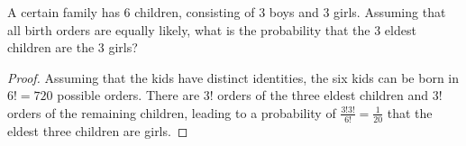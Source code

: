\begin{exercise}{24}
A certain family has 6 children, consisting of 3 boys and 3 girls. Assuming that all
birth orders are equally likely, what is the probability that the 3 eldest children are the
3 girls?
\end{exercise}

\begin{proof}
    Assuming that the kids have distinct identities, the six kids can be born in $6! = 720$ possible orders. There are $3!$ orders of the three eldest children and $3!$ orders of the remaining children, leading to a probability of $\frac{3!3!}{6!} = \frac{1}{20}$ that the eldest three children are girls.
\end{proof}


